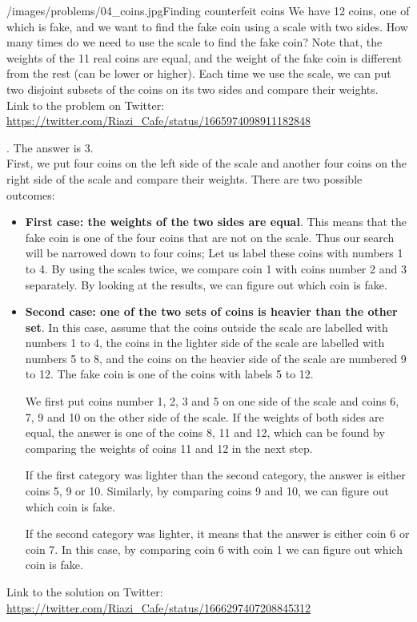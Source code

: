 \begin{problem}{/images/problems/04_coins.jpg}{Finding counterfeit coins}
    We have 12 coins, one of which is fake, and we want to find the fake coin using a scale with two sides. How many times do we need to use the scale to find the fake coin? Note that, the weights of the 11 real coins are equal, and the weight of the fake coin is different from the rest (can be lower or higher). Each time we use the scale, we can put two disjoint subsets of the coins on its two sides and compare their weights.\\[0.2cm]

Link to the problem on Twitter:  \url{https://twitter.com/Riazi_Cafe/status/1665974098911182848}
\end{problem}
\begin{solution}.
The answer is 3.\\[0.2cm]

First, we put four coins on the left side of the scale and another four coins on the right side of the scale and compare their weights. There are two possible outcomes:

\begin{itemize}
\item \textbf{First case: the weights of the two sides are equal}. This means that the fake coin is one of the four coins that are not on the scale. Thus our search will be narrowed down to four coins; Let us label these coins with numbers 1 to 4. By using the scales twice, we compare coin 1 with coins number 2 and 3 separately. By looking at the results, we can figure out which coin is fake.

\item \textbf{Second case: one of the two sets of coins is heavier than the other set}. In this case, assume that the coins outside the scale are labelled with numbers 1 to 4, the coins in the lighter side of the scale are labelled with numbers 5 to 8, and the coins on the heavier side of the scale are numbered 9 to 12. The fake coin is one of the coins with labels 5 to 12.

We first put coins number 1, 2, 3 and 5 on one side of the scale and coins 6, 7, 9 and 10 on the other side of the scale. If the weights of both sides are equal, the answer is one of the coins 8, 11 and 12, which can be found by comparing the weights of coins 11 and 12 in the next step.

If the first category was lighter than the second category, the answer is either coins 5, 9 or 10. Similarly, by comparing coins 9 and 10, we can figure out which coin is fake.

If the second category was lighter, it means that the answer is either coin 6 or coin 7. In this case, by comparing coin 6 with coin 1 we can figure out which coin is fake.
\end{itemize}

Link to the solution on Twitter:  \url{https://twitter.com/Riazi_Cafe/status/1666297407208845312}
\end{solution}